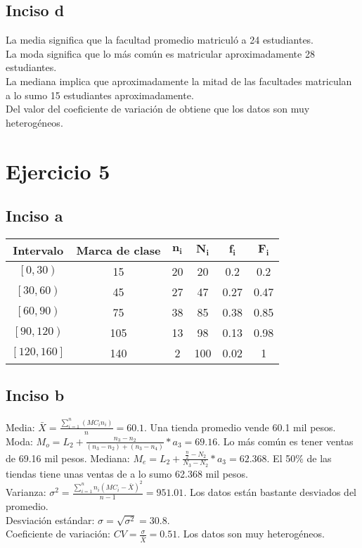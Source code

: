\documentclass[a4paper,12pt]{article}
\begin{document}
\subsection*{Inciso d}
La media significa que la facultad promedio matriculó a 24 estudiantes.\\
La moda significa que lo más común es matricular aproximadamente 28 estudiantes.\\
La mediana implica que aproximadamente la mitad de las facultades matriculan a lo sumo 15 estudiantes aproximadamente.\\
Del valor del coeficiente de variación de obtiene que los datos son muy heterogéneos.
\section*{Ejercicio 5}
\subsection*{Inciso a}
\begin{tabular}{|c|c|c|c|c|c|}
	\hline
	   \textbf{Intervalo}     & \textbf{Marca de clase} & $ \mathbf{n_i} $ & $ \mathbf{N_i} $ & $\mathbf{ f_i} $ & $ \mathbf{F_i} $ \\ \hline
	 $ \left[ 0,30\right) $   &           15            &        20        &        20        &       0.2        &       0.2        \\ \hline
	 $ \left[ 30,60\right) $  &           45            &        27        &        47        &       0.27       &       0.47       \\ \hline
	 $ \left[ 60,90\right) $  &           75            &        38        &        85        &       0.38       &       0.85       \\ \hline
	$ \left[ 90,120\right) $  &           105           &        13        &        98        &       0.13       &       0.98       \\ \hline
	$ \left[ 120,160\right] $ &           140           &        2         &       100        &       0.02       &        1         \\ \hline
\end{tabular}
\subsection*{Inciso b}
Media: $ \bar{X} = \frac{\sum_{i=1}^{n}(MC_{i}n_{i})}{n} = 60.1$. Una tienda promedio vende 60.1 mil pesos.\\
Moda: $ M_{o} = L_{2} + \frac{n_{3}-n_{2}}{(n_{3}-n_{2})+(n_{3}-n_{4})}*a_{3} = 69.16$. Lo más común es tener ventas de 69.16 mil pesos.
Mediana: $ M_{e} = L_{2} + \frac{\frac{n}{2} - N_{2}}{N_{3}-N_{2}}*a_{3} = 62.368 $. El 50$ \% $ de las tiendas tiene unas ventas de a lo sumo 62.368 mil pesos.\\
Varianza: $ \sigma^{2} = \frac{\sum_{i=1}^{n}n_{i}(MC_{i}-\bar{X})^{2}}{n-1}= 951.01 $. Los datos están bastante desviados del promedio.\\
Desviación estándar: $ \sigma = \sqrt{\sigma^{2}} = 30.8 $.\\
Coeficiente de variación: $ CV = \frac{\sigma}{\bar{X}} = 0.51 $. Los datos son muy heterogéneos. 
\end{document}
